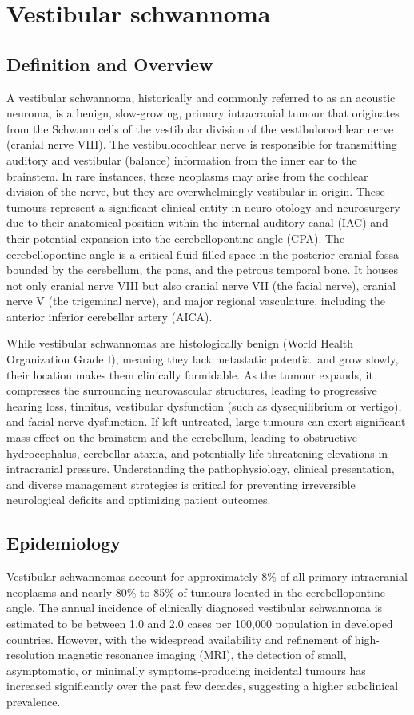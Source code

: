 \chapter{Vestibular schwannoma}

\section*{Definition and Overview}
A vestibular schwannoma, historically and commonly referred to as an acoustic neuroma, is a benign, slow-growing, primary intracranial tumour that originates from the Schwann cells of the vestibular division of the vestibulocochlear nerve (cranial nerve VIII). The vestibulocochlear nerve is responsible for transmitting auditory and vestibular (balance) information from the inner ear to the brainstem. In rare instances, these neoplasms may arise from the cochlear division of the nerve, but they are overwhelmingly vestibular in origin. These tumours represent a significant clinical entity in neuro-otology and neurosurgery due to their anatomical position within the internal auditory canal (IAC) and their potential expansion into the cerebellopontine angle (CPA). The cerebellopontine angle is a critical fluid-filled space in the posterior cranial fossa bounded by the cerebellum, the pons, and the petrous temporal bone. It houses not only cranial nerve VIII but also cranial nerve VII (the facial nerve), cranial nerve V (the trigeminal nerve), and major regional vasculature, including the anterior inferior cerebellar artery (AICA).

While vestibular schwannomas are histologically benign (World Health Organization Grade I), meaning they lack metastatic potential and grow slowly, their location makes them clinically formidable. As the tumour expands, it compresses the surrounding neurovascular structures, leading to progressive hearing loss, tinnitus, vestibular dysfunction (such as dysequilibrium or vertigo), and facial nerve dysfunction. If left untreated, large tumours can exert significant mass effect on the brainstem and the cerebellum, leading to obstructive hydrocephalus, cerebellar ataxia, and potentially life-threatening elevations in intracranial pressure. Understanding the pathophysiology, clinical presentation, and diverse management strategies is critical for preventing irreversible neurological deficits and optimizing patient outcomes.

\section*{Epidemiology}
Vestibular schwannomas account for approximately 8\% of all primary intracranial neoplasms and nearly 80\% to 85\% of tumours located in the cerebellopontine angle. The annual incidence of clinically diagnosed vestibular schwannoma is estimated to be between 1.0 and 2.0 cases per 100,000 population in developed countries. However, with the widespread availability and refinement of high-resolution magnetic resonance imaging (MRI), the detection of small, asymptomatic, or minimally symptoms-producing incidental tumours has increased significantly over the past few decades, suggesting a higher subclinical prevalence.

